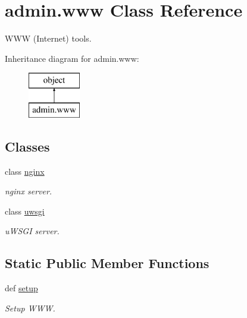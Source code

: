 \hypertarget{classadmin_1_1www}{\section{admin.\-www Class Reference}
\label{classadmin_1_1www}
}


W\-W\-W (Internet) tools.  


Inheritance diagram for admin.\-www\-:\begin{figure}[H]
\begin{center}
\leavevmode
\includegraphics[height=2.000000cm]{d6/dae/classadmin_1_1www}
\end{center}
\end{figure}
\subsection*{Classes}
\begin{DoxyCompactItemize}
\item 
class \hyperlink{classadmin_1_1www_1_1nginx}{nginx}
\begin{DoxyCompactList}\small\item\em nginx server. \end{DoxyCompactList}\item 
class \hyperlink{classadmin_1_1www_1_1uwsgi}{uwsgi}
\begin{DoxyCompactList}\small\item\em u\-W\-S\-G\-I server. \end{DoxyCompactList}\end{DoxyCompactItemize}
\subsection*{Static Public Member Functions}
\begin{DoxyCompactItemize}
\item 
def \hyperlink{classadmin_1_1www_a7a25fbce0b213fb06adc0e8602a980d7}{setup}
\begin{DoxyCompactList}\small\item\em Setup W\-W\-W. \end{DoxyCompactList}\end{DoxyCompactItemize}
